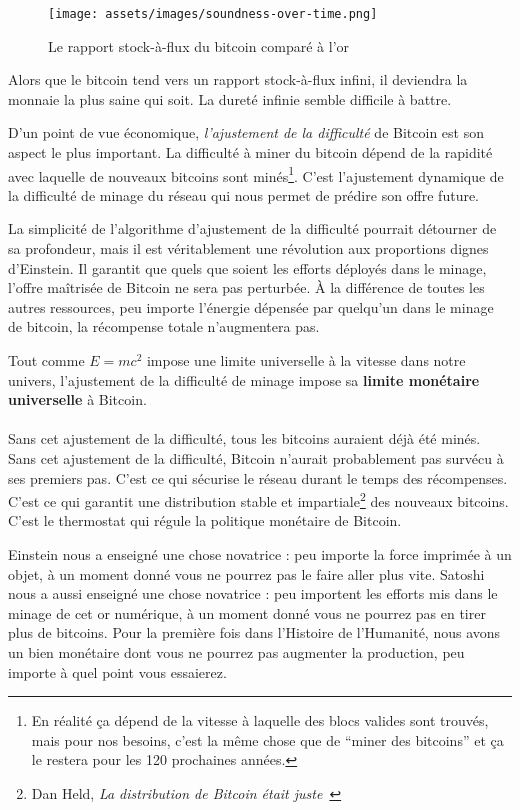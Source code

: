 \begin{figure}
  \texttt{[image: assets/images/soundness-over-time.png]}
  \caption{Le rapport stock-à-flux du bitcoin comparé à l'or}
  \label{fig:soundness-over-time}
\end{figure}

Alors que le bitcoin tend vers un rapport stock-à-flux infini, il deviendra la
monnaie la plus saine qui soit. La dureté infinie semble difficile à battre.

D'un point de vue économique, \textit{l'ajustement de la difficulté} de Bitcoin
est son aspect le plus important. La difficulté à miner du bitcoin dépend de la
rapidité avec laquelle de nouveaux bitcoins sont minés\footnote{En réalité ça
dépend de la vitesse à laquelle des blocs valides sont trouvés, mais pour nos
besoins, c'est la même chose que de \enquote{miner des bitcoins} et ça le
restera pour les 120 prochaines années.}. C'est l'ajustement dynamique de la
difficulté de minage du réseau qui nous permet de prédire son offre future.

La simplicité de l'algorithme d'ajustement de la difficulté pourrait détourner
de sa profondeur, mais il est véritablement une révolution aux proportions
dignes d'Einstein. Il garantit que quels que soient les efforts déployés dans le
minage, l'offre maîtrisée de Bitcoin ne sera pas perturbée. À la différence de
toutes les autres ressources, peu importe l'énergie dépensée par quelqu'un dans
le minage de bitcoin, la récompense totale n'augmentera pas.

Tout comme $E=mc^2$ impose une limite universelle à la vitesse dans notre
univers, l'ajustement de la difficulté de minage impose sa \textbf{limite
monétaire universelle} à Bitcoin.

\paragraph{}
Sans cet ajustement de la difficulté, tous les bitcoins auraient déjà été minés.
Sans cet ajustement de la difficulté, Bitcoin n'aurait probablement pas survécu
à ses premiers pas. C'est ce qui sécurise le réseau durant le temps des
récompenses. C'est ce qui garantit une distribution stable et
impartiale\footnote{Dan Held, \textit{La distribution de Bitcoin était
juste}~\cite{distribution-was-fair}} des nouveaux bitcoins. C'est le thermostat
qui régule la politique monétaire de Bitcoin.

Einstein nous a enseigné une chose novatrice : peu importe la force imprimée à
un objet, à un moment donné vous ne pourrez pas le faire aller plus vite.
Satoshi nous a aussi enseigné une chose novatrice : peu importent les efforts
mis dans le minage de cet or numérique, à un moment donné vous ne pourrez pas en
tirer plus de bitcoins. Pour la première fois dans l'Histoire de l'Humanité,
nous avons un bien monétaire dont vous ne pourrez pas augmenter la production,
peu importe à quel point vous essaierez.

